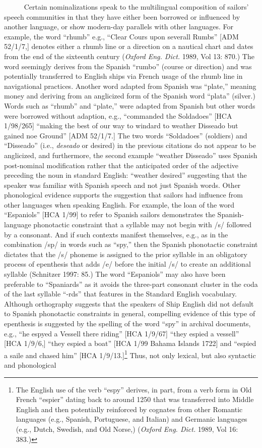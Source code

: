 \begin{styleStandard}
~~~ \ \ Certain nominalizations speak to the multilingual composition of sailors’ speech communities in that they have either been borrowed or influenced by another language, or show modern-day parallels with other languages. For example, the word “rhumb” e.g., “Clear Cours upon severall Rumbs” [ADM 52/1/7,] denotes either a rhumb line or a direction on a nautical chart and dates from the end of the sixteenth century (\textit{Oxford Eng. Dict. }1989, Vol 13: 870.) The word seemingly derives from the Spanish “rumbo” (course or direction) and was potentially transferred to English ships via French usage of the rhumb line in navigational practices. Another word adapted from Spanish was “plate,” meaning money and deriving from an anglicized form of the Spanish word “plata” (silver.) Words such as “rhumb” and “plate,” were adapted from Spanish but other words were borrowed without adaption, e.g., “commanded the\textit{ }Soldadoes” [HCA 1/98/265] “making the best of our way to windard to weather Disseado but gained noe Ground” [ADM 52/1/7.] The two words “Soldadoes” (soldiers) and “Disseado” (i.e., \textit{deseado} or desired) in the previous citations do not appear to be anglicized, and furthermore, the second example “weather Disseado” uses Spanish post-nominal modification rather that the anticipated order of the adjective preceding the noun in standard English: “weather desired” suggesting that the speaker was familiar with Spanish speech and not just Spanish words. Other phonological evidence supports the suggestion that sailors had influence from other languages when speaking English. For example, the loan of the word “Espaniols” [HCA 1/99] to refer to Spanish sailors demonstrates the Spanish-language phonotactic constraint that a syllable may not begin with /s/ followed by a consonant. And if such contexts manifest themselves, e.g., as in the combination /sp/ in words such as “spy,” then the Spanish phonotactic constraint dictates that the /s/ phoneme is assigned to the prior syllable in an obligatory process of epenthesis that adds /e/ before the initial /s/ to create an additional syllable (Schnitzer 1997: 85.) The word “Espaniols” may also have been preferable to “Spaniards” as it avoids the three-part consonant cluster in the coda of the last syllable “-rds” that features in the Standard English vocabulary. Although orthography suggests that the speakers of Ship English did not default to Spanish phonotactic constraints in general, compelling evidence of this type of epenthesis is suggested by the spelling of the word “spy” in archival documents, e.g., “he espyed a Vessell there riding” [HCA 1/9/67] “they espied a vessell” [HCA 1/9/6,] “they espied a boat” [HCA 1/99 Bahama Islands 1722] and “espied a saile and chased him” [HCA 1/9/13.]\footnote{ The English use of the verb “espy” derives, in part, from a verb form in Old French “espier” dating back to around 1250 that was transferred into Middle English and then potentially reinforced by cognates from other Romantic languages (e.g., Spanish, Portuguese, and Italian) and Germanic languages (e.g., Dutch, Swedish, and Old Norse,) (\textit{Oxford Eng. Dict. }1989, Vol 16: 383.)} Thus, not only lexical, but also syntactic and phonological 
\end{styleStandard}
